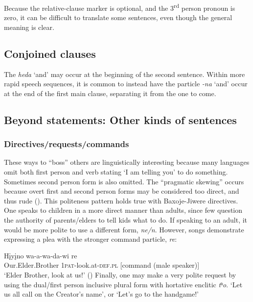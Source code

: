 \documentclass[output=paper]{LSP/langsci}
\begin{document}
Because the relative-clause marker is optional, and the 3\textsuperscript{rd} person pronoun is zero, it can be difficult to translate some sentences, even though the general meaning is clear.      	

\subsection{Conjoined clauses}	
The  \textit{heda} `and' may occur at the beginning of the second sentence.  Within more rapid speech sequences, it is common to instead have the particle \textit{-na} `and' occur at the end of the first main clause, separating it from the one to come.	

\subsection{Beyond statements: Other kinds of sentences} 

\subsubsection{Directives/requests/commands}  These ways to ``boss'' others are linguistically interesting because many languages omit both first person and verb stating `I am telling you' to do something.  Sometimes second person form is also omitted. The ``pragmatic skewing'' occurs because overt first and second person forms may be considered too direct, and thus rude (\citealt{Heath1998}). This politeness pattern holds true with Baxoje-Jiwere directives. One speaks to children in a more direct manner than adults, since few question the authority of parents/elders to tell kids what to do.  If speaking to an adult, it would be more polite to use a different form, \textit{ne/n}.  However, songs demonstrate expressing a plea with the stronger command particle, \textit{re}: 	     											

\ea \gll H\k{i}y\k{i}no    		 wa-a-wa-da-wi          re 	\\                                  	 
Our.Elder.Brother 1\textsc{pat}-look.at-\textsc{def.pl}  [command (male speaker)]	 \\	   	    
\trans `Elder Brother, look at us!'  (\citealt{Davidson1997})  	
\z				             
Finally, one may make a very polite request by using the dual/first person inclusive plural form with hortative enclitic \textit{tʰo}. `Let us all call on the Creator's name', or `Let's go to the handgame!'  		
\end{document}

